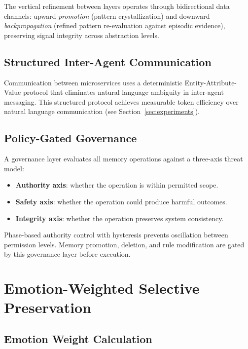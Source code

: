 \documentclass[11pt,a4paper]{article}
\begin{document}
The vertical refinement between layers operates through bidirectional data channels: upward
\emph{promotion} (pattern crystallization) and downward \emph{backpropagation} (refined
pattern re-evaluation against episodic evidence), preserving signal integrity across
abstraction levels.

\subsection{Structured Inter-Agent Communication}

Communication between microservices uses a deterministic Entity-Attribute-Value protocol
that eliminates natural language ambiguity in inter-agent messaging. This structured protocol
achieves measurable token efficiency over natural language communication
(see Section~\ref{sec:experiments}).

\subsection{Policy-Gated Governance}

A governance layer evaluates all memory operations against a three-axis threat model:
\begin{itemize}[itemsep=2pt]
  \item \textbf{Authority axis}: whether the operation is within permitted scope.
  \item \textbf{Safety axis}: whether the operation could produce harmful outcomes.
  \item \textbf{Integrity axis}: whether the operation preserves system consistency.
\end{itemize}

Phase-based authority control with hysteresis prevents oscillation between permission levels.
Memory promotion, deletion, and rule modification are gated by this governance layer before
execution.

\section{Emotion-Weighted Selective Preservation}

\subsection{Emotion Weight Calculation}
\end{document}
